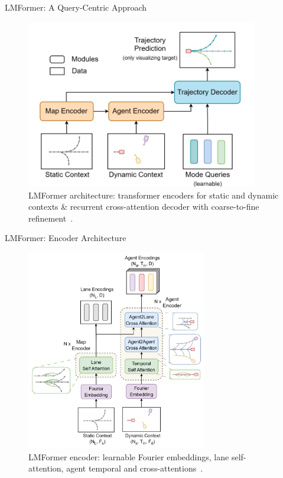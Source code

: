 \documentclass[10pt,aspectratio=169]{beamer}
\begin{document}
\begin{frame}{LMFormer: A Query-Centric Approach}
    \begin{figure}
        \centering
        \includegraphics[width=0.9\textwidth]{docs/figures/lmformer_arch.png}
        \caption{LMFormer architecture: transformer encoders for static and dynamic contexts \& recurrent cross-attention decoder with coarse-to-fine refinement~\cite{lmformerYadav2025}.}
    \end{figure}
\end{frame}

\begin{frame}{LMFormer: Encoder Architecture}
    \begin{figure}
        \centering
        \includegraphics[width=0.7\textwidth]{docs/figures/lmformer_arch_encorder.png}
        \caption{LMFormer encoder: learnable Fourier embeddings, lane self-attention, agent temporal and cross-attentions~\cite{lmformerYadav2025}.}
    \end{figure}
\end{frame}
\end{document}
